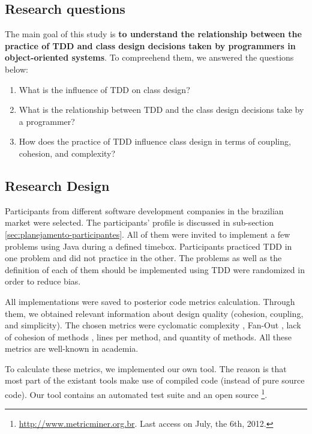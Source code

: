\documentclass[conference]{IEEEtran}
\begin{document}
\subsection{Research questions}

The main goal of this study is \textbf{to understand the relationship between
the practice of TDD and class design decisions taken by programmers in object-oriented
systems}. To compreehend them, we answered the questions below:

\begin{enumerate}

	\item What is the influence of TDD on class design?

	\item What is the relationship between TDD and the class design decisions take
	by a programmer?

	\item How does the practice of TDD influence class design in terms of coupling, 
	cohesion, and complexity?

\end{enumerate}

\subsection{Research Design}

Participants from different software development companies in the brazilian
market were selected. The participants' profile is discussed in sub-section
\ref{sec:planejamento-participantes}. All of them were invited to implement
a few problems using Java during a defined timebox. Participants practiced
TDD in one problem and did not practice in the other. The problems
as well as the definition of each of them should be implemented using TDD were
randomized in order to reduce bias.

All implementations were saved to posterior code metrics calculation.
Through them, we obtained relevant information about design quality (cohesion, 
coupling, and simplicity). The chosen metrics were cyclomatic complexity \cite{mccabe},
Fan-Out \cite{lorenz}, lack of cohesion of methods \cite{lcom-hs}, lines per method,
and quantity of methods. All these metrics are well-known in academia.

To calculate these metrics, we implemented our own tool. The reason is that
most part of the existant tools make use of compiled code (instead of pure source
code). Our tool contains an automated test suite and an open source
\footnote{\url{http://www.metricminer.org.br}. 
Last access on July, the 6th, 2012.}.
\end{document}
